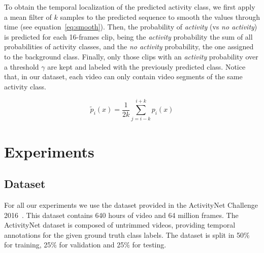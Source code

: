 \documentclass{article}
\begin{document}

To obtain the temporal localization of the predicted activity class, we first apply a mean filter of $k$ samples to the predicted sequence to smooth the values through time (see equation~\ref{eq:smooth}).
Then, the probability of \textit{activity} (vs \textit{no activity}) is predicted for each 16-frames clip, being the \textit{activity} probability the sum of all probabilities of activity classes, and the \textit{no activity} probability, the one assigned to the background class.
Finally, only those clips with an \textit{activity} probability over a threshold $\gamma$ are kept and labeled with the previously predicted class.
Notice that, in our dataset, each video can only contain video segments of the same activity class.

\begin{equation}
	\tilde{p}_i(x) = \frac{1}{2k} \sum_{j=i-k}^{i+k} p_i(x)
    \label{eq:smooth}
\end{equation}



\section{Experiments}

\subsection{Dataset}
For all our experiments we use the dataset provided in the ActivityNet Challenge 2016~\cite{caba2015activitynet}. This dataset contains 640 hours of video and 64 million frames. The ActivityNet dataset is composed of untrimmed videos, providing temporal annotations for the given ground truth class labels. The dataset is split in 50\% for training, 25\% for validation and 25\% for testing.
\end{document}
